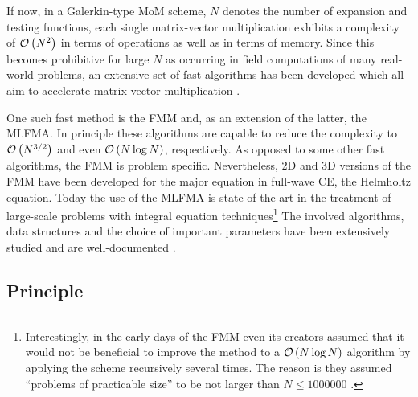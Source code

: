 If now, in a Galerkin-type \ac{MoM} scheme, $N$ denotes the number of expansion
and testing functions, each single matrix-vector multiplication exhibits a
complexity of $\mathcal{O} \left( N^2 \right)$ in terms of operations as well as in terms of
memory. Since this becomes prohibitive for large $N$ as occurring in
field computations of many real-world problems, an extensive set of fast
algorithms has been developed which all aim to accelerate matrix-vector
multiplication \cite[chapter 11]{Jin2015}.

One such fast method is the \ac{FMM} and, as an extension of the latter, the
\ac{MLFMA}. In principle these algorithms are capable to reduce the complexity
to $\mathcal{O} \left( N^{3/2} \right)$ and even $\mathcal{O} \left( N \log N \right)$, respectively.
As opposed to some other fast algorithms, the \ac{FMM} is problem
specific. 
Nevertheless, 2D \cite{Rokhlin1990} and 3D \cite{Rokhlin1993, Coifman1993}
versions of the \ac{FMM} have been developed for the major equation in
full-wave \ac{CE}, the Helmholtz equation.
Today the use of the \ac{MLFMA} is state of the art in the treatment of
large-scale problems with integral equation techniques\footnote{Interestingly,
in the early days of the \ac{FMM} even its creators assumed that it would not be
beneficial to improve the method to a $\mathcal{O} \left( N \log N \right)$ algorithm by
applying the scheme recursively several times. The reason is they assumed
\enquote{problems of practicable size} to be not larger than
$N \le \num{1000000}$ \cite{Rokhlin1993}.}
The involved algorithms, data structures and the choice of important
parameters have been extensively studied and  are well-documented
\cite{Chew2001}.

\subsection{Principle}

